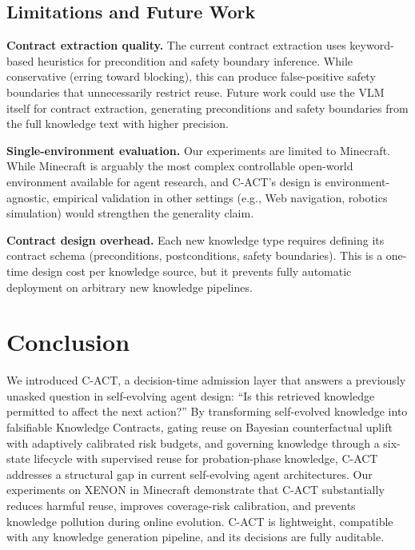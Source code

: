 \documentclass[letterpaper]{article}
\begin{document}
\subsection{Limitations and Future Work}

\textbf{Contract extraction quality.} The current contract extraction uses keyword-based heuristics for precondition and safety boundary inference. While conservative (erring toward blocking), this can produce false-positive safety boundaries that unnecessarily restrict reuse. Future work could use the VLM itself for contract extraction, generating preconditions and safety boundaries from the full knowledge text with higher precision.

\textbf{Single-environment evaluation.} Our experiments are limited to Minecraft. While Minecraft is arguably the most complex controllable open-world environment available for agent research, and \textsc{C-ACT}'s design is environment-agnostic, empirical validation in other settings (e.g., Web navigation, robotics simulation) would strengthen the generality claim.

\textbf{Contract design overhead.} Each new knowledge type requires defining its contract schema (preconditions, postconditions, safety boundaries). This is a one-time design cost per knowledge source, but it prevents fully automatic deployment on arbitrary new knowledge pipelines.

\section{Conclusion}

We introduced \textsc{C-ACT}, a decision-time admission layer that answers a previously unasked question in self-evolving agent design: ``Is this retrieved knowledge permitted to affect the next action?'' By transforming self-evolved knowledge into falsifiable Knowledge Contracts, gating reuse on Bayesian counterfactual uplift with adaptively calibrated risk budgets, and governing knowledge through a six-state lifecycle with supervised reuse for probation-phase knowledge, \textsc{C-ACT} addresses a structural gap in current self-evolving agent architectures. Our experiments on \textsc{XENON} in Minecraft demonstrate that \textsc{C-ACT} substantially reduces harmful reuse, improves coverage-risk calibration, and prevents knowledge pollution during online evolution. \textsc{C-ACT} is lightweight, compatible with any knowledge generation pipeline, and its decisions are fully auditable.


\end{document}
